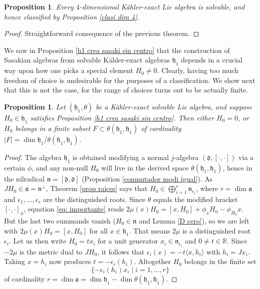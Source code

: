\documentclass[12pt, twoside]{amsart}
\def\d{\mathfrak{d}}
\def\h{\mathfrak{h}}
\def\n{\mathfrak{n}}
\def\a{\mathfrak{a}}
\def\R{\mathbb{R}}
\newtheorem{prop}[definition]{Proposition}
\theoremstyle{definition}
\begin{document}
\begin{prop} \label{kahler soluble}
Every $4$-dimensional K{\"a}hler-exact Lie algebra is solvable, and hence classified by Proposition \ref{clasi dim 4}.
\end{prop}
\begin{proof}
Straightforward consequence of the previous theorem.
\end{proof}


We saw in Proposition \ref{h1 crea sasaki sin centro} that the construction 
of Sasakian algebras from solvable K{\"a}hler-exact algebras  $\h_1$ depends in a crucial way upon how one picks a special element $H_0\neq 0$. Clearly, having too much freedom of choice is undesirable for the purposes of a classification. We show next that this is not the case, for the range of choices turns out to be actually finite.

\begin{prop}\label{prop: finite}
    Let $(\h_1,\theta)$ be a K{\"a}hler-exact  solvable Lie algebra, and suppose $H_0\in \h_1$ satisfies Proposition \ref{h1 crea sasaki sin centro}. Then either $H_0=0$, or $H_0$ belongs in a finite subset $F\subset \theta(\h_1,\h_1)$ of cardinality $|F|=\dim\h_1 / \theta(\h_1,\h_1)$.
\end{prop}
%
\begin{proof}
The algebra $\h_1$ is obtained modifying a normal $j$-algebra $(\d,[\cdot,\cdot])$ via a certain $\phi$, and any non-null $H_0$ will live in the derived space $\theta(\h_1,\h_1)$, hence in the nilradical $\n=[\d,\d]$ (Proposition \ref{conmutador modi igual}).
As $JH_0\in\a=\n^\perp$, Theorem \ref{prop raices} says that $H_0\in \bigoplus_{i=1}^r \n_{\epsilon_i}$, where $r=\dim \a$ and $\epsilon_1,\ldots,  \epsilon_r$ are the distinguished roots. Since $\theta$ equals the modified bracket $[\cdot ,\cdot ]_\phi$, equation \eqref{eq: importante} reads
$2\mu(x)H_0= [x,H_0]+\phi_x H_0-\phi_{H_0} x$. But the last two summands vanish ($H_0\in \n$ and Lemma \ref{D cero}), so we are left with
$2\mu(x)H_0=[x,H_0]$ for all $x\in \h_1$. That means $2\mu$ is a distinguished root $\epsilon_i$. Let us then write $H_0=tx_i$ for a unit generator $x_i\in\n_{\epsilon_i}$ and $0\neq t \in \R$. Since $-2\mu$ is the metric dual to $JH_0$, it follows that    $\epsilon_{i}(x)=-t\langle x, h_i \rangle$ 
with $h_i=Jx_i$. Taking $x=h_i$ now produces  $t=-\epsilon_i(h_i)$. Altogether $H_0$ belongs in the finite set 
\[\{-\epsilon_i(h_i)x_i \mid i=1,\ldots,  r\}\]
of cardinality $r=\dim \a=\dim\h_1-\dim \theta(\h_1,\h_1)$.
\end{proof}
\end{document}
